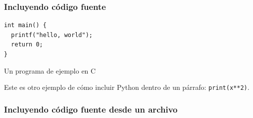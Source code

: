 \begin{frame}[fragile] %
\frametitle{Incluyendo código fuente}
\begin{listing}
\begin{verbatim}
int main() {
  printf("hello, world");
  return 0;
}
\end{verbatim}
\caption{Un programa de ejemplo en C}\label{lst:hello}
\end{listing}

Este es otro ejemplo de cómo incluir Python dentro de un párrafo: \texttt{print(x**2)}.

\end{frame}

\begin{frame}[fragile] %
\frametitle{Incluyendo código fuente desde un archivo}
\end{frame}
